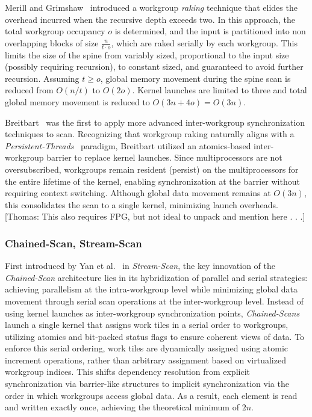 \documentclass[sigconf]{acmart}
\newcommand{\thomas}[1]{{\footnotesize\color{orange}[Thomas: #1]}}
\begin{document}
Merill and Grimshaw~\cite{} introduced a workgroup \emph{raking} technique that elides the overhead incurred when the recursive depth exceeds two. In this approach, the total workgroup occupancy $o$ is determined, and the input is partitioned into non overlapping blocks of size $\frac{n}{t \cdot o}$, which are raked serially by each workgroup. This limits the size of the spine from variably sized, proportional to the input size (possibly requiring recursion), to constant sized, and guaranteed to avoid further recursion. Assuming $t \geq o$, global memory movement during the spine scan is reduced from $O(n/t)$ to $O(2o)$. Kernel launches are limited to three and total global memory movement is reduced to $O(3n + 4o) = O(3n)$.

Breitbart~\cite{} was the first to apply more advanced inter-workgroup synchronization techniques to scan. Recognizing that workgroup raking naturally aligns with a \emph{Persistent-Threads}~\cite{} paradigm, Breitbart utilized an atomics-based inter-workgroup barrier to replace kernel launches. Since multiprocessors are not oversubscribed, workgroups remain resident (persist) on the multiprocessors for the entire lifetime of the kernel, enabling synchronization at the barrier without requiring context switching. Although global data movement remains at $O(3n)$, this consolidates the scan to a single kernel, minimizing launch overheads. \thomas{This also requires FPG, but not ideal to unpack and mention here . . .}

\subsubsection{Chained-Scan, Stream-Scan}
First introduced by Yan et al.~\cite{} in \emph{Stream-Scan}, the key innovation of the \emph{Chained-Scan} architecture lies in its hybridization of parallel and serial strategies: achieving parallelism at the intra-workgroup level while minimizing global data movement through serial scan operations at the inter-workgroup level. Instead of using kernel launches as inter-workgroup synchronization points, \emph{Chained-Scans} launch a single kernel that assigns work tiles in a serial order to workgroups, utilizing atomics and bit-packed status flags to ensure coherent views of data. To enforce this serial ordering, work tiles are dynamically assigned using atomic increment operations, rather than arbitrary assignment based on virtualized workgroup indices. This shifts dependency resolution from explicit synchronization via barrier-like structures to implicit synchronization via the order in which workgroups access global data. As a result, each element is read and written exactly once, achieving the theoretical minimum of $2n$.
\end{document}
